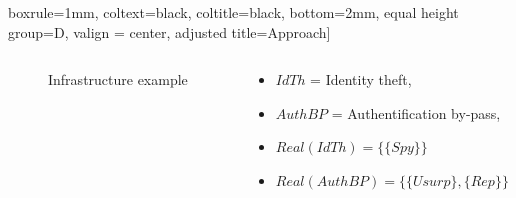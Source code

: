\documentclass{beamer}
\begin{document}
\begin{frame}[fragile]{}
\begin{tcolorbox}[adjusted title={\centering\large Attack models}]
\begin{columns}[T]
\begin{column}{.65\textwidth}
\begin{tcolorbox}
                boxrule=1mm,
                coltext=black, %
                coltitle=black, %
                bottom=2mm,
                equal height group=D,
                valign = center,
                adjusted title={\large Approach}]
                    \vspace{-1.25em}
                    \begin{columns}[c]
                        \begin{column}{.5\textwidth}
                            \begin{figure}[htb]
                                \centering
                                \resizebox{\textwidth}{!}{
                                    
                                }
                                \vspace{-1.8em}
                                \caption{Infrastructure example}
                                \label{fig:ex_archi}
                            \end{figure}
                        \end{column}
                        \begin{column}{.5\textwidth}
                            \begin{itemize}
                                \item $IdTh$ = Identity theft,
                                \item $AuthBP$ = Authentification by-pass,
                                \item $Real(IdTh) = \{ \{ Spy \} \}$
                                \item $Real(AuthBP) = \{ \{ Usurp \}, \{ Rep \} \}$
                            \end{itemize}
                        \end{column}
                    \end{columns}
                    \vspace{-.75em}
                    \begin{columns}[c]
                        \hspace{.1cm}
                        \begin{column}{.3\textwidth}
                            \begin{table}[htb]
                                \vspace{1.15em}
                                \centering
                                \begin{tabular}{|c|c|c|}

\end{tabular}
\end{table}
\end{column}
\end{columns}
\end{tcolorbox}
\end{column}
\end{columns}
\end{tcolorbox}
\end{frame}
\end{document}
